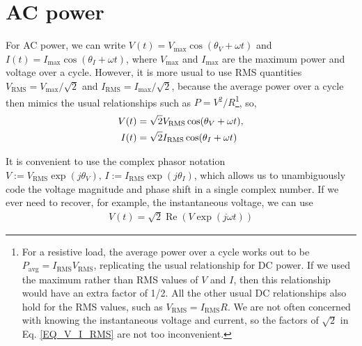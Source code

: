 \documentclass[10pt]{article}
\newcommand{\re}[1]{\ensuremath{\operatorname{Re}(#1)}}
\begin{document}
\section{AC power}
For AC power, we can write $V(t) = V_\text{max} \cos(\theta_V + \omega t)$ and $I(t) = I_\text{max} \cos(\theta_I + \omega t)$, where $V_\text{max}$ and $I_\text{max}$ are the maximum power and voltage over a cycle. However, it is more usual to use RMS quantities $V_\text{RMS} = V_\text{max}/\sqrt{2}$ and $I_\text{RMS} = I_\text{max}/\sqrt{2}$, because the average power over a cycle then mimics the usual relationships such as $P = V^2/R$\footnote{For a resistive load, the average power over a cycle works out to be $P_\text{avg} = I_\text{RMS}V_\text{RMS}$, replicating the usual relationship for DC power. If we used the maximum rather than RMS values of $V$ and $I$, then this relationship would have an extra factor of 1/2. All the other usual DC relationships also hold for the RMS values, such as $V_\text{RMS} = I_\text{RMS}R$. We are not often concerned with knowing the instantaneous voltage and current, so the factors of $\sqrt{2}$ in Eq. \ref{EQ_V_I_RMS} are not too inconvenient.}, so,
\begin{align}
	V(t) &= \sqrt{2}V_\text{RMS} \cos(\theta_V + \omega t), \notag \\
	I(t) &= \sqrt{2}I_\text{RMS} \cos(\theta_I + \omega t)
	\label{EQ_V_I_RMS}
\end{align}

It is convenient to use the complex phasor notation $V := V_\text{RMS} \exp(j\theta_V), \, I := I_\text{RMS} \exp(j\theta_I)$, which allows us to unambiguously code the voltage magnitude and phase shift in a single complex number. If we ever need to recover, for example, the instantaneous voltage, we can use
\begin{align}
	V(t) = \sqrt{2}\re{V \exp(j\omega t)}
\end{align}
\end{document}
